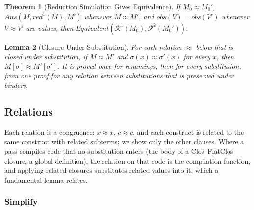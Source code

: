 \documentclass[10pt]{article}
\theoremstyle{acmplain}
\newtheorem{theorem}{Theorem}[section]
\newtheorem{lemma}[theorem]{Lemma}
\newcommand{\obs}{\mathit{obs}}
\newcommand{\Equiv}{\mathit{Equivalent}}
\begin{document}
\begin{theorem}[Reduction Simulation Gives Equivalence]\label{thm:red-equivalent}
If $M_0 \approx M_0'$, $\mathit{Ans}(M, \mathit{red}^1(M), M')$ whenever $M \approx M'$, and
$\obs(V) = \obs(V')$ whenever $V \approx V'$ are values, then
$\Equiv(\mathcal{R}^1(M_0), \mathcal{R}^2(M_0'))$.
\end{theorem}

\begin{lemma}[Closure Under Substitution]\label{lem:red-subst}
For each relation $\approx$ below that is closed under substitution, if
$M \approx M'$ and $\sigma(x) \approx \sigma'(x)$ for every $x$, then
$M[\sigma] \approx M'[\sigma']$. It is proved once for renamings, then for
every substitution, from one proof for any relation between substitutions
that is preserved under binders.
\end{lemma}

\subsection{Relations}\label{sec:red-relations}

Each relation is a congruence: $x \approx x$, $c \approx c$, and each
construct is related to the same construct with related subterms; we show
only the other clauses. Where a pass compiles code that no substitution
enters (the body of a Clos--FlatClos closure, a global definition), the
relation on that code is the compilation function, and applying related
closures substitutes related values into it, which a fundamental lemma
relates.

\subsubsection{Simplify}
\end{document}
